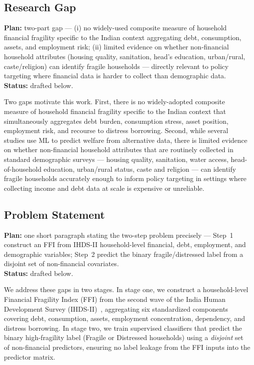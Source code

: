 \documentclass[colorlinks,balance]{asmeconf}
\begin{document}
\subsection{Research Gap}
\begin{outline}
\textbf{Plan:} two-part gap --- (i) no widely-used composite measure of household financial fragility specific to the Indian context aggregating debt, consumption, assets, and employment risk; (ii) limited evidence on whether non-financial household attributes (housing quality, sanitation, head's education, urban/rural, caste/religion) can identify fragile households --- directly relevant to policy targeting where financial data is harder to collect than demographic data.\\
\textbf{Status:} drafted below.
\end{outline}
Two gaps motivate this work. First, there is no widely-adopted composite measure of household financial fragility specific to the Indian context that simultaneously aggregates debt burden, consumption stress, asset position, employment risk, and recourse to distress borrowing. Second, while several studies use ML to predict welfare from alternative data, there is limited evidence on whether non-financial household attributes that are routinely collected in standard demographic surveys --- housing quality, sanitation, water access, head-of-household education, urban/rural status, caste and religion --- can identify fragile households accurately enough to inform policy targeting in settings where collecting income and debt data at scale is expensive or unreliable.

\subsection{Problem Statement}
\begin{outline}
\textbf{Plan:} one short paragraph stating the two-step problem precisely --- Step~1 construct an FFI from IHDS-II household-level financial, debt, employment, and demographic variables; Step~2 predict the binary fragile/distressed label from a disjoint set of non-financial covariates.\\
\textbf{Status:} drafted below.
\end{outline}
We address these gaps in two stages. In stage one, we construct a household-level Financial Fragility Index (FFI) from the second wave of the India Human Development Survey (IHDS-II)~\cite{ihds2}, aggregating six standardized components covering debt, consumption, assets, employment concentration, dependency, and distress borrowing. In stage two, we train supervised classifiers that predict the binary high-fragility label (Fragile or Distressed households) using a \emph{disjoint} set of non-financial predictors, ensuring no label leakage from the FFI inputs into the predictor matrix.
\end{document}
